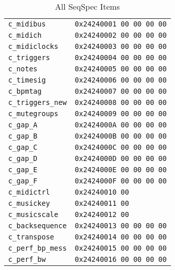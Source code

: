    \begin{table}[htb]
      \centering
      \caption{All SeqSpec Items}
      \label{table:seqspec_items_all}
      \begin{tabular}{l l}
         \texttt{c\_midibus}        & \texttt{0x24240001 00 00 00 00} \\
         \texttt{c\_midich}         & \texttt{0x24240002 00 00 00 00} \\
         \texttt{c\_midiclocks}     & \texttt{0x24240003 00 00 00 00} \\
         \texttt{c\_triggers}       & \texttt{0x24240004 00 00 00 00} \\
         \texttt{c\_notes}          & \texttt{0x24240005 00 00 00 00} \\
         \texttt{c\_timesig}        & \texttt{0x24240006 00 00 00 00} \\
         \texttt{c\_bpmtag}         & \texttt{0x24240007 00 00 00 00} \\
         \texttt{c\_triggers\_new}  & \texttt{0x24240008 00 00 00 00} \\
         \texttt{c\_mutegroups}     & \texttt{0x24240009 00 00 00 00} \\
         \texttt{c\_gap\_A}         & \texttt{0x2424000A 00 00 00 00} \\
         \texttt{c\_gap\_B}         & \texttt{0x2424000B 00 00 00 00} \\
         \texttt{c\_gap\_C}         & \texttt{0x2424000C 00 00 00 00} \\
         \texttt{c\_gap\_D}         & \texttt{0x2424000D 00 00 00 00} \\
         \texttt{c\_gap\_E}         & \texttt{0x2424000E 00 00 00 00} \\
         \texttt{c\_gap\_F}         & \texttt{0x2424000F 00 00 00 00} \\
         \texttt{c\_midictrl}       & \texttt{0x24240010 00} \\
         \texttt{c\_musickey}       & \texttt{0x24240011 00} \\
         \texttt{c\_musicscale}     & \texttt{0x24240012 00} \\
         \texttt{c\_backsequence}   & \texttt{0x24240013 00 00 00 00} \\
         \texttt{c\_transpose}      & \texttt{0x24240014 00 00 00 00} \\
         \texttt{c\_perf\_bp\_mess} & \texttt{0x24240015 00 00 00 00} \\
         \texttt{c\_perf\_bw}       & \texttt{0x24240016 00 00 00 00} \\

\end{tabular}
\end{table}
